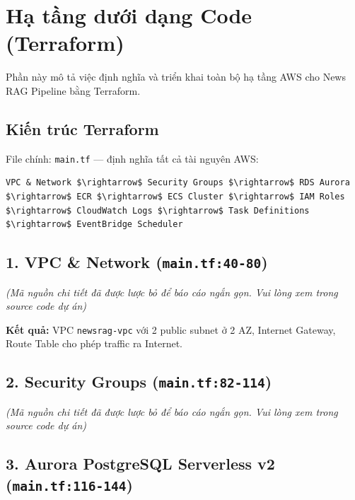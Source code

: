 \hypertarget{hux1ea1-tux1ea7ng-dux1b0ux1edbi-dux1ea1ng-code-terraform}{%
\section{Hạ tầng dưới dạng Code
(Terraform)}}

Phần này mô tả việc định nghĩa và triển khai toàn bộ hạ tầng AWS cho
News RAG Pipeline bằng Terraform.

\hypertarget{kiux1ebfn-truxfac-terraform}{%
\subsection{Kiến trúc Terraform}}

File chính: \texttt{main.tf} --- định nghĩa tất cả tài nguyên AWS:

\begin{verbatim}
VPC & Network $\rightarrow$ Security Groups $\rightarrow$ RDS Aurora $\rightarrow$ ECR $\rightarrow$ ECS Cluster $\rightarrow$ IAM Roles $\rightarrow$ CloudWatch Logs $\rightarrow$ Task Definitions $\rightarrow$ EventBridge Scheduler
\end{verbatim}

\hypertarget{vpc-network-main.tf40-80}{%
\subsection{\texorpdfstring{1. VPC \& Network
(\texttt{main.tf:40-80})}{1. VPC \& Network (main.tf:40-80)}}}

\emph{(Mã nguồn chi tiết đã được lược bỏ để báo cáo ngắn gọn. Vui lòng
xem trong source code dự án)}

\textbf{Kết quả:} VPC \texttt{newsrag-vpc} với 2 public subnet ở 2 AZ,
Internet Gateway, Route Table cho phép traffic ra Internet.

\hypertarget{security-groups-main.tf82-114}{%
\subsection{\texorpdfstring{2. Security Groups
(\texttt{main.tf:82-114})}{2. Security Groups (main.tf:82-114)}}}

\emph{(Mã nguồn chi tiết đã được lược bỏ để báo cáo ngắn gọn. Vui lòng
xem trong source code dự án)}

\hypertarget{aurora-postgresql-serverless-v2-main.tf116-144}{%
\subsection{\texorpdfstring{3. Aurora PostgreSQL Serverless v2
(\texttt{main.tf:116-144})}{3. Aurora PostgreSQL Serverless v2 (main.tf:116-144)}}}

